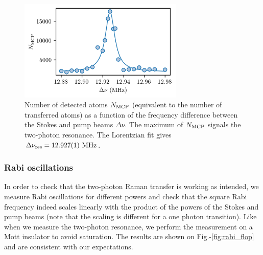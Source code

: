 \begin{figure}
    \centering
    \includegraphics[width=0.7\textwidth]{Fig/Chapter3/raman_res.png}
    \caption[Two-photon Raman transfer resonance]{Number of detected atoms $N_{\rm{MCP}}$ (equivalent to the number of transferred atoms) as a function of the frequency difference between the Stokes and pump beams $\Delta \nu$. The maximum of $N_{\rm{MCP}}$ signals the two-photon resonance. The Lorentzian fit gives $\Delta \nu_{\rm{res}} = 12.927(1) \ \rm{MHz}$.}
    \label{fig:raman_resonance}
\end{figure}

\subsubsection{Rabi oscillations}

In order to check that the two-photon Raman transfer is working as intended, we measure Rabi oscillations for different powers and check that the square Rabi frequency indeed scales linearly with the product of the powers of the Stokes and pump beams (note that the scaling is different for a one photon transition). Like when we measure the two-photon resonance, we perform the measurement on a Mott insulator to avoid saturation. The results are shown on Fig.-\ref{fig:rabi_flop} and are consistent with our expectations.

